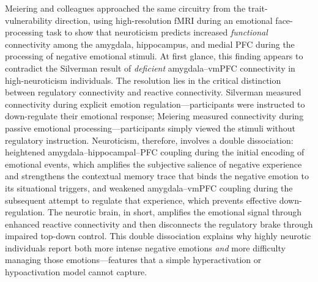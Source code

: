 Meiering and colleagues approached the same circuitry from the
trait-vulnerability direction, using high-resolution fMRI during an
emotional face-processing task to show that neuroticism predicts increased
\emph{functional} connectivity among the amygdala, hippocampus, and medial
PFC during the processing of negative emotional stimuli.  At first
glance, this finding appears to contradict the Silverman result of
\emph{deficient} amygdala--vmPFC connectivity in high-neuroticism
individuals.  The resolution lies in the critical distinction between
regulatory connectivity and reactive connectivity.  Silverman measured
connectivity during explicit emotion regulation---participants were
instructed to down-regulate their emotional response; Meiering measured
connectivity during passive emotional processing---participants simply
viewed the stimuli without regulatory instruction.  Neuroticism, therefore,
involves a double dissociation: heightened amygdala--hippocampal--PFC
coupling during the initial encoding of emotional events, which amplifies
the subjective salience of negative experience and strengthens the
contextual memory trace that binds the negative emotion to its situational
triggers, and weakened amygdala--vmPFC coupling during the subsequent
attempt to regulate that experience, which prevents effective
down-regulation.  The neurotic brain, in short, amplifies the emotional
signal through enhanced reactive connectivity and then disconnects the
regulatory brake through impaired top-down control.  This double
dissociation explains why highly neurotic individuals report both more
intense negative emotions \emph{and} more difficulty managing those
emotions---features that a simple hyperactivation or hypoactivation model
cannot capture.

